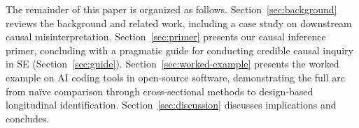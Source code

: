 The remainder of this paper is organized as follows.
Section~\ref{sec:background} reviews the background and related work, including a case study on downstream causal misinterpretation.
Section~\ref{sec:primer} presents our causal inference primer, concluding with a pragmatic guide for conducting credible causal inquiry in SE (Section~\ref{sec:guide}).
Section~\ref{sec:worked-example} presents the worked example on AI coding tools in open-source software, demonstrating the full arc from na\"ive comparison through cross-sectional methods to design-based longitudinal identification.
Section~\ref{sec:discussion} discusses implications and concludes.